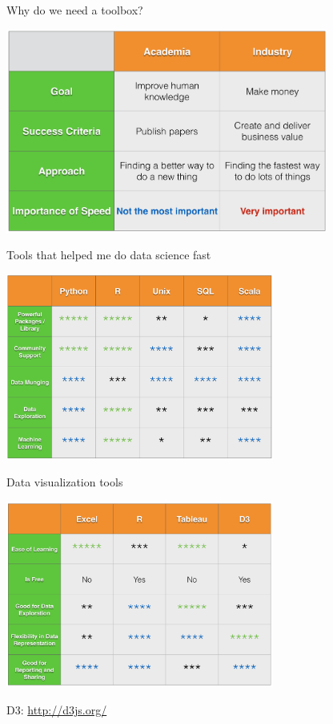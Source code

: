 \documentclass[10pt]{beamer}
\begin{document}
    \begin{frame}{Why do we need a toolbox?}
      \begin{center}
        \includegraphics[width=300pt]{../graphs/academia_industry}
      \end{center}
    \end{frame}
    
    \begin{frame}{Tools that helped me do data science fast}
      \begin{center}
         \includegraphics[width=250pt]{../graphs/data_tools}
      \end{center}
    \end{frame}

    \begin{frame}{Data visualization tools}
      \begin{center}
         \includegraphics[width=250pt]{../graphs/data_visualization_tools}
      \end{center}
      \centerline{\footnotesize D3: \url{http://d3js.org/}}
    \end{frame}
\end{document}
